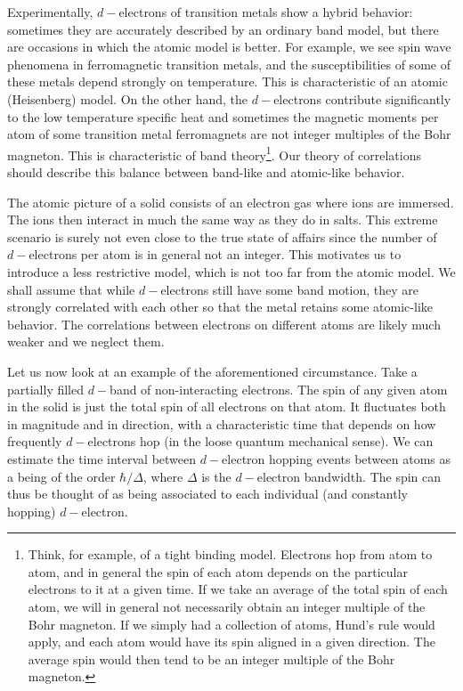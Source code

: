 Experimentally, $d-$electrons of transition metals show a hybrid behavior: sometimes they are accurately described by an ordinary band model, but there are occasions in which the atomic model is better. For example, we see spin wave phenomena in ferromagnetic transition metals, and the susceptibilities of some of these metals depend strongly on temperature. This is characteristic of an atomic (Heisenberg) model. On the other hand, the $d-$electrons contribute significantly to the low temperature specific heat and sometimes the magnetic moments per atom of some transition metal ferromagnets are not integer multiples of the Bohr magneton. This is characteristic of band theory\footnote{Think, for example, of a tight binding model. Electrons hop from atom to atom, and in general the spin of each atom depends on the particular electrons  to it at a given time. If we take an average of the total spin of each atom, we will in general not necessarily obtain an integer multiple of the Bohr magneton. If we simply had a collection of atoms, Hund's rule would apply, and each atom would have its spin aligned in a given direction. The average spin would then tend to be an integer multiple of the Bohr magneton.}. Our theory of correlations should describe this balance between band-like and atomic-like behavior.

The atomic picture of a solid consists of an electron gas where ions are immersed. The ions then interact in much the same way as they do in salts. This extreme scenario is surely not even close to the true state of affairs since the number of $d-$electrons per atom is in general not an integer. This motivates us to introduce a less restrictive model, which is not too far from the atomic model. We shall assume that while $d-$electrons still have some band motion, they are strongly correlated with each other so that the metal retains some atomic-like behavior. The correlations between electrons on different atoms are likely much weaker and we neglect them.

Let us now look at an example of the aforementioned circumstance. Take a partially filled $d-$band of non-interacting electrons. The spin of any given atom in the solid is just the total spin of all electrons on that atom. It fluctuates both in magnitude and in direction, with a characteristic time that depends on how frequently $d-$electrons hop (in the loose quantum mechanical sense). We can estimate the time interval between $d-$electron hopping events between atoms as a being of the order $\hbar / \Delta$, where $\Delta$ is the $d-$electron bandwidth. The spin can thus be thought of as being associated to each individual (and constantly hopping) $d-$electron.

